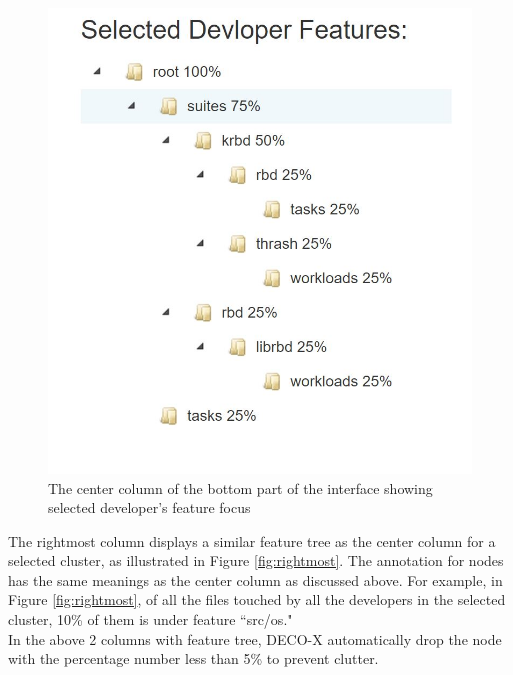 \documentclass{article}
\begin{document}
\begin{figure}[h!]
\centering
\includegraphics[scale=0.6]{images/center.JPG}
\caption{The center column of the bottom part of the interface showing selected developer's feature focus}
\label{fig:centercol}
\end{figure}

The rightmost column displays a similar feature tree as the center column for a selected cluster, as illustrated in Figure \ref{fig:rightmost}. The annotation for nodes has the same meanings as the center column as discussed above. For example, in Figure \ref{fig:rightmost}, of all the files touched by all the developers in the selected cluster, 10\% of them is under feature ``src/os."\\
In the above 2 columns with feature tree, DECO-X automatically drop the node with the percentage number less than 5\% to prevent clutter. 
\end{document}
